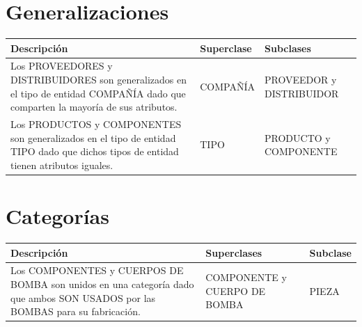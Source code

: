\documentclass[]{report}
\begin{document}
	\section*{\centering Generalizaciones}
	\begin{center}
		\begin{tabular}{ | p{10cm} | p{3.5cm} | p{3.5cm}|}
			\hline
		
			Descripción & Superclase & Subclases \\
			\hline
		
			Los PROVEEDORES y DISTRIBUIDORES son generalizados en el tipo de entidad
			COMPAÑÍA dado que comparten la mayoría de sus atributos. & COMPAÑÍA & PROVEEDOR y 				DISTRIBUIDOR \\
			\hline
			
			Los PRODUCTOS y COMPONENTES son generalizados en el tipo de entidad
			TIPO dado que dichos tipos de entidad tienen atributos iguales. 
			& TIPO & PRODUCTO y COMPONENTE \\
			\hline
			
		\end{tabular}
	\end{center}
	
	\section*{\centering Categorías}
	\begin{center}
		\begin{tabular}{ | p{10cm} | p{3.5cm} | p{3.5cm}|}
			\hline
		
			Descripción & Superclases & Subclase \\
			\hline
		
		 	Los COMPONENTES y CUERPOS DE BOMBA son unidos en una categoría dado que
		 	ambos SON USADOS por las BOMBAS para su fabricación. & COMPONENTE y 
		 	CUERPO DE BOMBA & PIEZA \\
			\hline		
			
		\end{tabular}
	\end{center}
	
	
\end{document}
